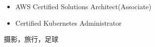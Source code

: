 \documentclass{resume}
\begin{document}



\begin{body}
	\begin{itemize}[noitemsep,topsep=0pt]
		\item AWS Certified Solutions Architect(Associate)
		\item Certified Kubernetes Administrator
	\end{itemize}
\end{body}


\begin{body}
	摄影，旅行，足球
\end{body}
\end{document}
